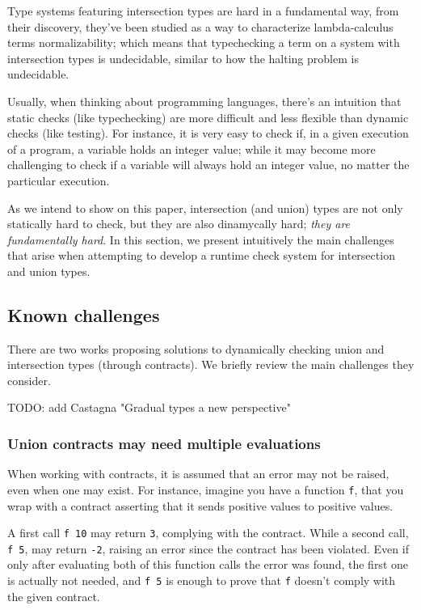 Type systems featuring intersection types are hard in a fundamental way,
from their discovery, they've been studied as a way to characterize
lambda-calculus terms normalizability; which means that typechecking a
term on a system with intersection types is undecidable,
similar to how the halting problem is undecidable.

Usually, when thinking about programming languages, there's an intuition
that static checks (like typechecking) are more difficult and less flexible
than dynamic checks (like testing). For instance, it is very easy to check if,
in a given execution of a program, a variable holds an integer value; while it
may become more challenging to check if a variable will always hold an integer value,
no matter the particular execution.

As we intend to show on this paper, intersection (and union) types are not only
statically hard to check, but they are also dinamycally hard;
\textit{they are fundamentally hard}.
In this section, we present intuitively the main challenges that arise
when attempting to develop a runtime check system for intersection and
union types.

\subsection{Known challenges}

There are two works proposing solutions to dynamically checking union and intersection
types (through contracts). We briefly review the main challenges they consider.

TODO: add Castagna "Gradual types a new perspective"

\subsubsection*{Union contracts may need multiple evaluations}

When working with contracts, it is assumed that an error may not be raised, even
when one may exist. For instance, imagine you have a function \texttt{f}, that
you wrap with a contract asserting that it sends positive values to positive values.

A first call \texttt{f 10} may return \texttt{3}, complying with the contract.
While a second call, \texttt{f 5}, may return \texttt{-2}, raising an error since
the contract has been violated. Even if only after evaluating both of this function calls
the error was found, the first one is actually not needed, and \texttt{f 5} is enough to
prove that \texttt{f} doesn't comply with the given contract.

